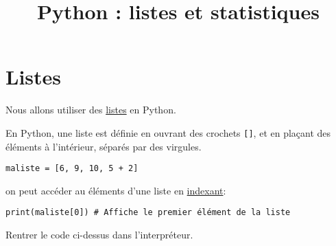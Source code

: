\documentclass[
	classe=$2^{de}$,
	headerTitle=Python
]{informatique}
\title{Python : listes et statistiques}
\begin{document}
\maketitle



\section{Listes}

Nous allons utiliser des \uline{listes} en Python.

En Python, une liste est définie en ouvrant des crochets \texttt{[]}, et en plaçant des éléments à l'intérieur, séparés par des virgules.

\begin{lstlisting}
maliste = [6, 9, 10, 5 + 2]
\end{lstlisting}

on peut accéder au éléments d'une liste en \uline{indexant}:

\begin{lstlisting}
print(maliste[0]) # Affiche le premier élément de la liste
\end{lstlisting}

Rentrer le code ci-dessus dans l'interpréteur.
\end{document}
